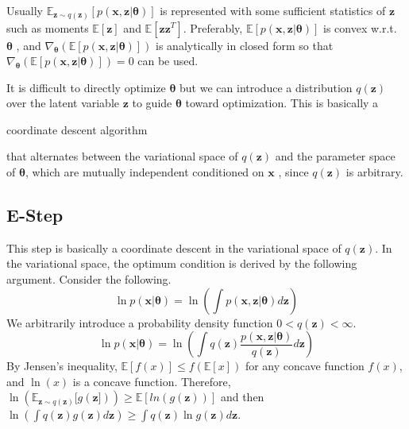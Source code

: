 \documentclass[a4]{article}
\begin{document}
Usually
$ \mathbb{E}_{\mathbf{z}\sim q(\mathbf{z})}[p(\mathbf{x},\mathbf{z}|\bm{\theta})]$
is represented with some sufficient statistics of
$\mathbf{z}$
such as moments
$\mathbb{E}[\mathbf{z}]$
and
$\mathbb{E}[\mathbf{z}\mathbf{z}^T]$.
Preferably,
$ \mathbb{E}[p(\mathbf{x},\mathbf{z}|\bm{\theta})]$
is convex w.r.t.
$\bm{\theta}$
, and
$\nabla_{\bm{\theta}} ( \mathbb{E}[p(\mathbf{x},\mathbf{z}|\bm{\theta})] )$
is analytically in closed form so that
$\nabla_{\bm{\theta}} ( \mathbb{E}[p(\mathbf{x},\mathbf{z}|\bm{\theta})] ) = 0$
can be used. 


It is difficult to directly optimize
$\bm{\theta}$
but we can introduce a distribution
$q(\mathbf{z})$
over the latent variable 
$\mathbf{z}$
to guide
$\bm{\theta}$
toward optimization.
This is basically a \begin{bf}coordinate descent algorithm\end{bf}
 that alternates between the variational space of
$q(\mathbf{z})$
and the parameter space of
$\bm{\theta}$, 
which are mutually independent conditioned on
$\mathbf{x}$
, since 
$q(\mathbf{z})$
is arbitrary.


\subsection{E-Step}
This step is basically a coordinate descent in the variational space of $q(\mathbf{z})$.
In the variational space, the optimum condition is derived by the following argument.
Consider the following.
\[
    \ln p(\mathbf{x}|\bm{\theta}) =
    \ln (\int p(\mathbf{x},\mathbf{z}|\bm{\theta})d\mathbf{z})
\]
We arbitrarily introduce a probability density function $ 0 < q(\mathbf{z}) < \infty$.
\[
    \ln p(\mathbf{x}|\bm{\theta}) = 
    \ln (\int q(\mathbf{z}) \frac{p(\mathbf{x},\mathbf{z}|\bm{\theta})}
                                 {q(\mathbf{z})} 
         d\mathbf{z})
\]
By Jensen's inequality, $\mathbb{E}[f(x)] \le f(\mathbb{E}[x])$
for any concave function $f(x)$, and $\ln(x)$ is a concave function.
Therefore,
$\ln(\mathbb{E}_{\mathbf{z} \sim q(\mathbf{z})}[g(\mathbf{z}]))
\ge
\mathbb{E}[ln(g(\mathbf{z}))]
$
and then
$
 \ln (\int q(\mathbf{z})g(\mathbf{z}) d\mathbf{z})
\ge
\int q(\mathbf{z}) \ln g(\mathbf{z}) d\mathbf{z}
$.
\end{document}
